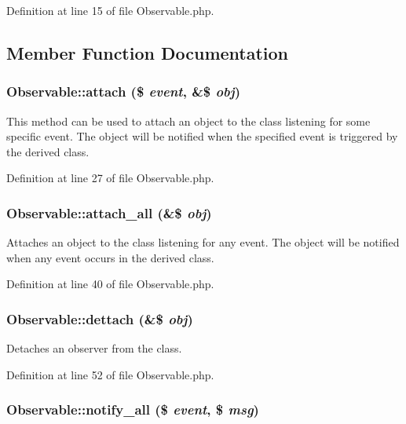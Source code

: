 Definition at line 15 of file Observable.php.

\subsection{Member Function Documentation}
\subsubsection{\setlength{\rightskip}{0pt plus 5cm}Observable::attach (\$ {\em event}, \&\$ {\em obj})}\label{classObservable_a1}


This method can be used to attach an object to the class listening for some specific event. The object will be notified when the specified event is triggered by the derived class. 

Definition at line 27 of file Observable.php.
\subsubsection{\setlength{\rightskip}{0pt plus 5cm}Observable::attach\_\-all (\&\$ {\em obj})}\label{classObservable_a2}


Attaches an object to the class listening for any event. The object will be notified when any event occurs in the derived class. 

Definition at line 40 of file Observable.php.
\subsubsection{\setlength{\rightskip}{0pt plus 5cm}Observable::dettach (\&\$ {\em obj})}\label{classObservable_a3}


Detaches an observer from the class. 

Definition at line 52 of file Observable.php.
\subsubsection{\setlength{\rightskip}{0pt plus 5cm}Observable::notify\_\-all (\$ {\em event}, \$ {\em msg})\hspace{0.3cm}{\tt  [protected]}}\label{classObservable_b0}


